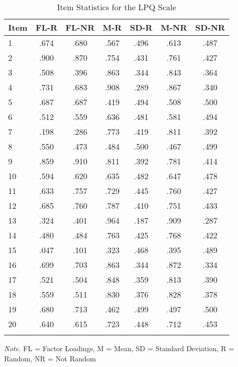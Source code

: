 \documentclass[english,man, mask]{apa6}
\theoremstyle{definition}
\theoremstyle{definition}
\theoremstyle{definition}
\theoremstyle{remark}
\begin{document}
\begin{table}[tbp]
\begin{center}
\begin{threeparttable}
\caption{\label{tab:Ltable}Item Statistics for the LPQ Scale}
\begin{tabular}{lcccccc}
\toprule
Item & \multicolumn{1}{c}{FL-R} & \multicolumn{1}{c}{FL-NR} & \multicolumn{1}{c}{M-R} & \multicolumn{1}{c}{SD-R} & \multicolumn{1}{c}{M-NR} & \multicolumn{1}{c}{SD-NR}\\
\midrule
1 & .674 & .680 & .567 & .496 & .613 & .487\\
2 & .900 & .870 & .754 & .431 & .761 & .427\\
3 & .508 & .396 & .863 & .344 & .843 & .364\\
4 & .731 & .683 & .908 & .289 & .867 & .340\\
5 & .687 & .687 & .419 & .494 & .508 & .500\\
6 & .512 & .559 & .636 & .481 & .581 & .494\\
7 & .198 & .286 & .773 & .419 & .811 & .392\\
8 & .550 & .473 & .484 & .500 & .467 & .499\\
9 & .859 & .910 & .811 & .392 & .781 & .414\\
10 & .594 & .620 & .635 & .482 & .647 & .478\\
11 & .633 & .757 & .729 & .445 & .760 & .427\\
12 & .685 & .760 & .787 & .410 & .751 & .433\\
13 & .324 & .401 & .964 & .187 & .909 & .287\\
14 & .480 & .484 & .763 & .425 & .768 & .422\\
15 & .047 & .101 & .323 & .468 & .395 & .489\\
16 & .699 & .703 & .863 & .344 & .872 & .334\\
17 & .521 & .504 & .848 & .359 & .813 & .390\\
18 & .559 & .511 & .830 & .376 & .828 & .378\\
19 & .680 & .713 & .462 & .499 & .497 & .500\\
20 & .640 & .615 & .723 & .448 & .712 & .453\\
\bottomrule
\addlinespace
\end{tabular}
\begin{tablenotes}[para]
\textit{Note.} FL = Factor Loadings, M = Mean, SD = Standard Deviation, R = Random, NR = Not Random
\end{tablenotes}
\end{threeparttable}
\end{center}
\end{table}
\end{document}
